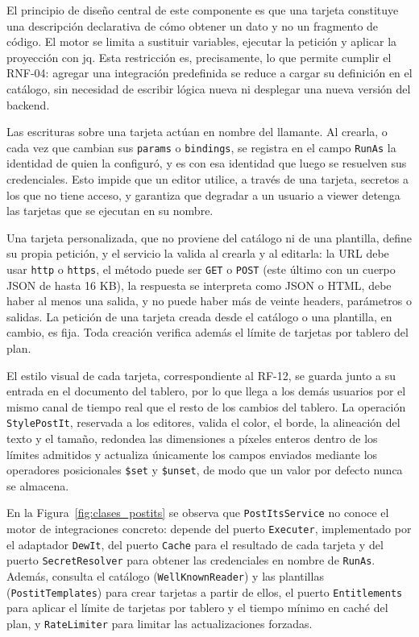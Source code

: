 El principio de diseño central de este componente es que una tarjeta constituye una descripción declarativa de cómo obtener un dato y no un fragmento de código. El motor se limita a sustituir variables, ejecutar la petición y aplicar la proyección con jq. Esta restricción es, precisamente, lo que permite cumplir el RNF-04: agregar una integración predefinida se reduce a cargar su definición en el catálogo, sin necesidad de escribir lógica nueva ni desplegar una nueva versión del backend.

Las escrituras sobre una tarjeta actúan en nombre del llamante. Al crearla, o cada vez que cambian sus \texttt{params} o \texttt{bindings}, se registra en el campo \texttt{RunAs} la identidad de quien la configuró, y es con esa identidad que luego se resuelven sus credenciales. Esto impide que un editor utilice, a través de una tarjeta, secretos a los que no tiene acceso, y garantiza que degradar a un usuario a viewer detenga las tarjetas que se ejecutan en su nombre.

Una tarjeta personalizada, que no proviene del catálogo ni de una plantilla, define su propia petición, y el servicio la valida al crearla y al editarla: la URL debe usar \texttt{http} o \texttt{https}, el método puede ser \texttt{GET} o \texttt{POST} (este último con un cuerpo JSON de hasta 16 KB), la respuesta se interpreta como JSON o HTML, debe haber al menos una salida, y no puede haber más de veinte headers, parámetros o salidas. La petición de una tarjeta creada desde el catálogo o una plantilla, en cambio, es fija. Toda creación verifica además el límite de tarjetas por tablero del plan.

El estilo visual de cada tarjeta, correspondiente al RF-12, se guarda junto a su entrada en el documento del tablero, por lo que llega a los demás usuarios por el mismo canal de tiempo real que el resto de los cambios del tablero. La operación \texttt{StylePostIt}, reservada a los editores, valida el color, el borde, la alineación del texto y el tamaño, redondea las dimensiones a píxeles enteros dentro de los límites admitidos y actualiza únicamente los campos enviados mediante los operadores posicionales \texttt{\$set} y \texttt{\$unset}, de modo que un valor por defecto nunca se almacena.

En la Figura~\ref{fig:clases_postits} se observa que \texttt{PostItsService} no conoce el motor de integraciones concreto: depende del puerto \texttt{Executer}, implementado por el adaptador \texttt{DewIt}, del puerto \texttt{Cache} para el resultado de cada tarjeta y del puerto \texttt{SecretResolver} para obtener las credenciales en nombre de \texttt{RunAs}. Además, consulta el catálogo (\texttt{WellKnownReader}) y las plantillas (\texttt{PostitTemplates}) para crear tarjetas a partir de ellos, el puerto \texttt{Entitlements} para aplicar el límite de tarjetas por tablero y el tiempo mínimo en caché del plan, y \texttt{RateLimiter} para limitar las actualizaciones forzadas.

